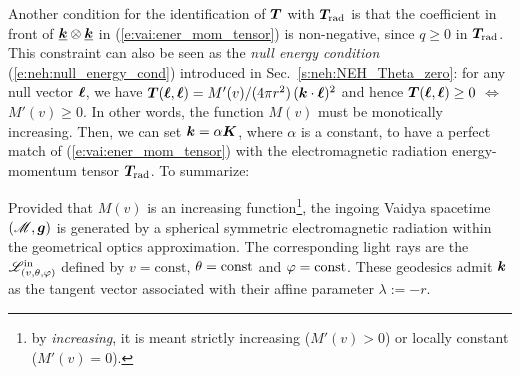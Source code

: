 Another condition for the identification of $\bm{T}$ with $\bm{T}_{\rm rad}$ is that the coefficient
in front of $\underline{\bm{k}} \otimes \underline{\bm{k}}$ in (\ref{e:vai:ener_mom_tensor})
is non-negative, since $q\geq 0$ in $\bm{T}_{\rm rad}$. This constraint can also be seen as the \emph{null energy condition} (\ref{e:neh:null_energy_cond}) introduced in
Sec.~\ref{s:neh:NEH_Theta_zero}: for any null vector $\bm{\ell}$, we have
$\bm{T}(\bm{\ell},\bm{\ell}) = M'(v)/(4\pi r^2)\, (\bm{k}\cdot\bm{\ell})^2$ and hence $\bm{T}(\bm{\ell},\bm{\ell}) \geq 0$ $\iff$
$M'(v) \geq 0$. In other words, the function $M(v)$ must be monotically increasing. Then, we can set
$\bm{k} = \alpha \bm{K}$, where $\alpha$ is a constant, to have a perfect match of (\ref{e:vai:ener_mom_tensor}) with the electromagnetic radiation energy-momentum
tensor $\bm{T}_{\rm rad}$.
To summarize:
\begin{prop}
Provided that $M(v)$ is an increasing function\footnote{by \emph{increasing}, it is meant
strictly increasing ($M'(v)>0$) or locally constant ($M'(v) = 0$).},
the ingoing Vaidya spacetime $(\mathscr{M},\bm{g})$ is generated by a spherical symmetric electromagnetic radiation
within the geometrical optics approximation. The corresponding light rays are the
$\mathscr{L}^{\rm in}_{(v,\theta,\varphi)}$
defined by $v=\mathrm{const}$, $\theta=\mathrm{const}$ and $\varphi=\mathrm{const}$.
These geodesics admit $\bm{k}$ as the tangent vector associated with their affine parameter
$\lambda := -r$.
\end{prop}


